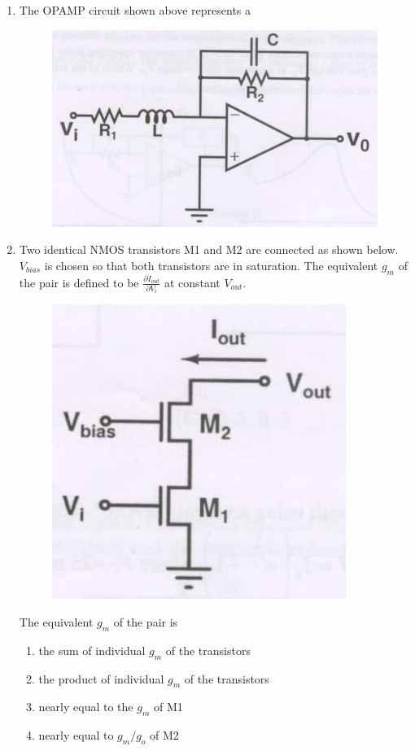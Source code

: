 \documentclass[a4paper, 11pt]{article}
\begin{document}
\begin{enumerate}
    \hfill{}
    
    \item The OPAMP circuit shown above represents a
    \begin{figure}[H]
        \centering
        \includegraphics[width=0.7\columnwidth]{q47}
        \caption*{}
        \label{fig:q47}
    \end{figure}
    \begin{enumerate}
    \end{enumerate}

    \hfill{}

    \item Two identical NMOS transistors M1 and M2 are connected as shown below. $V_{bias}$ is chosen so that both transistors are in saturation. The equivalent $g_m$ of the pair is defined to be $\frac{\partial I_{out}}{\partial V_i}$ at constant $V_{out}$.
    \begin{figure}[H]
        \centering
        \includegraphics[width=0.3\columnwidth]{q48}
        \caption*{}
        \label{fig:q48}
    \end{figure}
    The equivalent $g_m$ of the pair is
    \begin{enumerate}
        \item the sum of individual $g_m$ of the transistors
        \item the product of individual $g_m$ of the transistors
        \item nearly equal to the $g_m$ of M1
        \item nearly equal to $g_m/g_o$ of M2
    \end{enumerate}


\end{enumerate}
\end{document}

